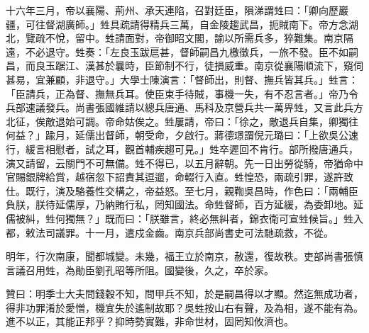 \begin{pinyinscope}
十六年三月，帝以襄陽、荊州、承天連陷，召對廷臣，隕涕謂甡曰：「卿向歷巖疆，可往督湖廣師。」甡具疏請得精兵三萬，自金陵趨武昌，扼賊南下。帝方念湖北，覽疏不悅，留中。甡請面對，帝御昭文閣，諭以所需兵多，猝難集。南京隔遠，不必退守。甡奏：「左良玉跋扈甚，督師嗣昌九檄徵兵，一旅不發。臣不如嗣昌，而良玉踞江、漢甚於曩時，臣節制不行，徒損威重。南京從襄陽順流下，窺伺甚易，宜兼顧，非退守。」大學士陳演言：「督師出，則督、撫兵皆其兵。」甡言：「臣請兵，正為督、撫無兵耳。使臣束手待賊，事機一失，有不忍言者。」帝乃令兵部速議發兵。尚書張國維請以總兵唐通、馬科及京營兵共一萬畀甡，又言此兵方北征，俟敵退始可調。帝命姑俟之。甡屢請，帝曰：「徐之，敵退兵自集，卿獨往何益？」踰月，延儒出督師，朝受命，夕啟行。蔣德璟謂倪元璐曰：「上欲吳公速行，緩言相慰者，試之耳，觀首輔疾趨可見。」甡卒遲回不肯行。部所撥唐通兵，演又請留，云關門不可無備。甡不得已，以五月辭朝。先一日出勞從騎，帝猶命中官賜銀牌給賞，越宿忽下詔責其逗遛，命輟行入直。甡惶恐，兩疏引罪，遂許致仕。既行，演及駱養性交構之，帝益怒。至七月，親鞫吳昌時，作色曰：「兩輔臣負朕，朕待延儒厚，乃納賄行私，罔知國法。命甡督師，百方延緩，為委卸地。延儒被糾，甡何獨無？」既而曰：「朕雖言，終必無糾者，錦衣衛可宣甡候旨。」甡入都，敕法司議罪。十一月，遣戍金齒。南京兵部尚書史可法馳疏救，不從。

明年，行次南康，聞都城變。未幾，福王立於南京，赦還，復故秩。吏部尚書張慎言議召用甡，為勛臣劉孔昭等所阻。國變後，久之，卒於家。

贊曰：明季士大夫問錢穀不知，問甲兵不知，於是嗣昌得以才顯。然迄無成功者，得非功罪淆於愛憎，機宜失於遙制故耶？吳甡按山右有聲，及為相，遂不能有為。進不以正，其能正邦乎？抑時勢實難，非命世材，固罔知攸濟也。


\end{pinyinscope}